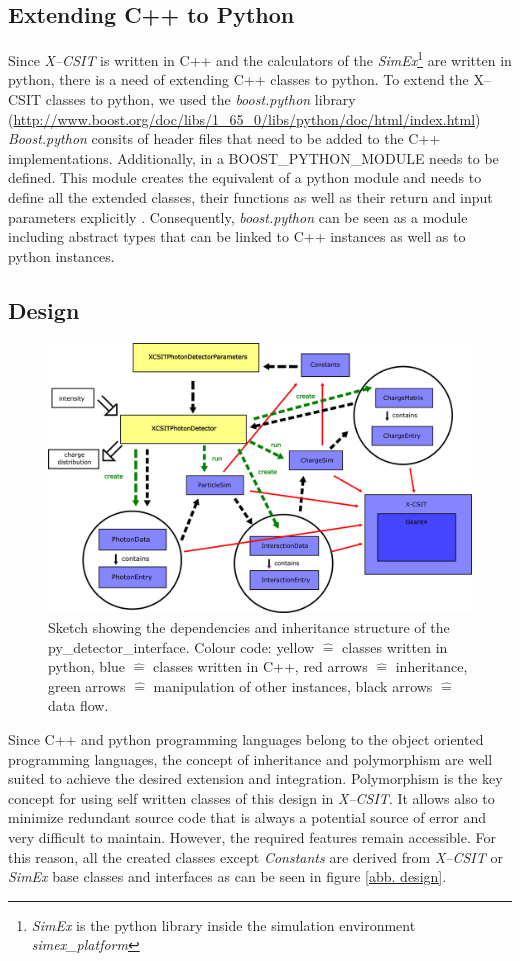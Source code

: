 \subsection{Extending C++ to Python}
Since \textit{X--CSIT} is written in C++ and the calculators of the
\textit{SimEx}\footnote{\textit{SimEx} is the python library inside the simulation
environment \textit{simex\_platform}} are written in python, there is a need of extending C++ classes
to python. To extend the X--CSIT classes to python, we used the
\textit{boost.python} library
(\url{http://www.boost.org/doc/libs/1_65_0/libs/python/doc/html/index.html})
\textit{Boost.python} consits of
header files that need to be added to the C++ implementations. Additionally, in
a BOOST\_PYTHON\_MODULE needs to be defined. This
module creates the equivalent of a python module and needs to define all the
extended classes, their functions as well as their return and input parameters
explicitly \cite{boostpython}. Consequently, \textit{boost.python} can be seen
as a module including abstract types that can be linked to C++ instances as well
as to python instances.

\subsection{Design}
%
\begin{figure}
  \centering
  \includegraphics[width=.99\textwidth]{figures/Design.png}
  \caption{Sketch showing the dependencies and inheritance structure of the py\_detector\_interface. Colour code: yellow $\hat{=}$ classes written in python, blue $\hat{=}$ classes written in C++, red arrows $\hat{=}$ inheritance, green arrows $\hat{=}$ manipulation of other instances, black arrows $\hat{=}$ data flow.}
  \label{abb. design}
\end{figure}
Since C++ and python programming languages belong to the object oriented
programming languages, the concept of inheritance and polymorphism are well
suited to achieve the desired extension and integration.
Polymorphism is the key concept for using self written
classes of this design in \textit{X--CSIT}. It allows also to minimize redundant
source code that is always a potential source of error and very difficult to
maintain. However, the required features remain accessible. For this reason, all
the created classes except \textit{Constants} are derived from \textit{X--CSIT}
or \textit{SimEx} base classes and interfaces as can be seen in figure \ref{abb.
design}.

